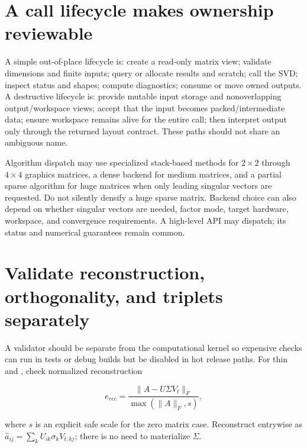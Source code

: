 \section{A call lifecycle makes ownership reviewable}\label{02-foundations-ii-ch038-a-call-lifecycle-makes-ownership-reviewable}

\hypertarget{02-foundations-ii-ch038-a-call-lifecycle-makes-ownership-reviewable}{}

A simple out-of-place lifecycle is: create a read-only matrix view; validate dimensions and finite inputs; query or allocate results and scratch; call the SVD; inspect status and shapes; compute diagnostics; consume or move owned outputs. A destructive lifecycle is: provide mutable input storage and nonoverlapping output/workspace views; accept that the input becomes packed/intermediate data; ensure workspace remains alive for the entire call; then interpret output only through the returned layout contract. These paths should not share an ambiguous name.

Algorithm dispatch may use specialized stack-based methods for \(2\times2\) through \(4\times4\) graphics matrices, a dense backend for medium matrices, and a partial sparse algorithm for huge matrices when only leading singular vectors are requested. Do not silently densify a huge sparse matrix. Backend choice can also depend on whether singular vectors are needed, factor mode, target hardware, workspace, and convergence requirements. A high-level API may dispatch; its status and numerical guarantees remain common.

\section{Validate reconstruction, orthogonality, and triplets separately}\label{02-foundations-ii-ch038-validate-reconstruction-orthogonality-and-triplets-separately}

\hypertarget{02-foundations-ii-ch038-validate-reconstruction-orthogonality-and-triplets-separately}{}

A validator should be separate from the computational kernel so expensive checks can run in tests or debug builds but be disabled in hot release paths. For thin  and , check normalized reconstruction

\[
e_{rec}=\frac{\|A-U\Sigma V_t\|_F}{\max(\|A\|_F,s)},
\]

where \(s\) is an explicit safe scale for the zero matrix case. Reconstruct entrywise as \(\hat a_{ij}=\sum_k U_{ik}\sigma_kV_{t,kj}\); there is no need to materialize \(\Sigma\).

